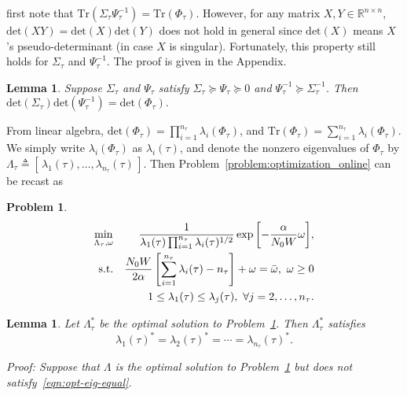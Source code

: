 \documentclass[twocolumn]{autart}    \usepackage{cite}
\newtheorem{lemma}[theorem]{Lemma}
\newtheorem{problem}[theorem]{Problem}
\begin{document}
{{first note that
$\mathrm{Tr}(\Sigma_\tau
\Psi_\tau^{-1})=\mathrm{Tr}
(\Phi_\tau).$
However, for any matrix $X,Y\in \mathbb{R}^{n\times n}$,
$\mathrm{det}(XY)=\mathrm{det}
(X)\mathrm{det}(Y)$ does not hold in general since $\mathrm{det}(X)$ means $X$'s
pseudo-determinant (in case $X$ is singular). Fortunately, this property still holds for $\Sigma_\tau$ and $\Psi_\tau^{-1}$.
The proof is given in the Appendix.
\begin{lemma}\label{lemma:det-transform}
Suppose $\Sigma_\tau$ and $\Psi_\tau$
satisfy $\Sigma_\tau\succeq \Psi_\tau\succeq 0$ and
$\Psi_\tau^{-1}\succeq \Sigma_\tau^{-1}$.
Then $\mathrm{det}(\Sigma_\tau)\mathrm{det}(\Psi_\tau^{-1})
=\mathrm{det}(\Phi_\tau).$
\end{lemma}
From linear algebra,
$
\mathrm{det}(\Phi_\tau)=
\prod_{i=1}^{n_\tau}\lambda_i(\Phi_\tau)$,
and $
\mathrm{Tr}(\Phi_\tau)
=\sum_{i=1}^{n_\tau}\lambda_i(\Phi_\tau).
$
We simply write
$\lambda_i(\Phi_\tau)$ as $\lambda_i(\tau)$,
and denote the nonzero
eigenvalues of $\Phi_\tau$ by
$\Lambda_\tau\triangleq
[\,\lambda_{1}(\tau),\ldots,\lambda_
{n_\tau}(\tau)\,]$. Then
Problem~\ref{problem:optimization_online}
can be recast as
\begin{problem}\label{problem:transform_optimization_online}
      \begin{eqnarray}
    \min_{\Lambda_\tau,\omega}
    &&\frac{1}{
    \lambda_1(\tau)\prod_{i=1}^{n_\tau}
    \lambda_i(\tau)^{1/2}}
    \exp{\left[-\frac{\alpha}{
    N_0W}\omega\right]},\label{eqn:objective-func-opt}\\
     \mathrm{s.t.} &&
    \frac{N_0W}{2\alpha}\left[
    \sum_{i=1}^{n_\tau}\lambda_i(\tau)-
    n_\tau\right]+\omega= \bar \omega,~ \omega\geq 0\notag\\
    &&1\leq\lambda_1(\tau)\leq \lambda_j(\tau),~
    \forall j=2,\ldots,n_\tau.\notag
  \end{eqnarray}
\end{problem}
\begin{lemma}\label{lemma:equal-eig}
Let $\Lambda_\tau^*$ be the optimal solution to Problem~\ref{problem:transform_optimization_online}.
Then $\Lambda_\tau^*$ satisfies
\begin{equation}\label{eqn:opt-eig-equal}
\lambda_1(\tau)^*=\lambda_2(\tau)^*
=\cdots=\lambda_{n_\tau}(\tau)^*.
\end{equation}
\begin{pf*}{Proof:}
Suppose that
$\Lambda$
is the optimal solution to
Problem~\ref{problem:transform_optimization_online}
but does not satisfy~\eqref{eqn:opt-eig-equal}.

\end{pf*}
\end{lemma}}}
\end{document}
